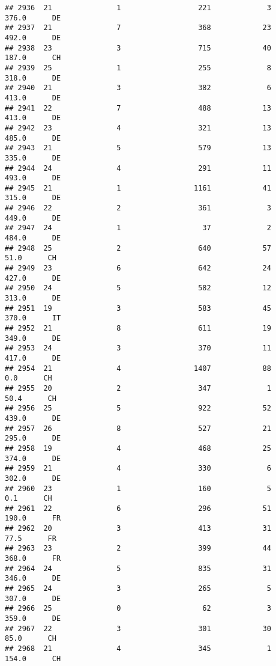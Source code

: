 \documentclass[
]{article}
\begin{document}
\begin{verbatim}
## 2936  21               1                  221             3    376.0      DE
## 2937  21               7                  368            23    492.0      DE
## 2938  23               3                  715            40    187.0      CH
## 2939  25               1                  255             8    318.0      DE
## 2940  21               3                  382             6    413.0      DE
## 2941  22               7                  488            13    413.0      DE
## 2942  23               4                  321            13    485.0      DE
## 2943  21               5                  579            13    335.0      DE
## 2944  24               4                  291            11    493.0      DE
## 2945  21               1                 1161            41    315.0      DE
## 2946  22               2                  361             3    449.0      DE
## 2947  24               1                   37             2    484.0      DE
## 2948  25               2                  640            57     51.0      CH
## 2949  23               6                  642            24    427.0      DE
## 2950  24               5                  582            12    313.0      DE
## 2951  19               3                  583            45    370.0      IT
## 2952  21               8                  611            19    349.0      DE
## 2953  24               3                  370            11    417.0      DE
## 2954  21               4                 1407            88      0.0      CH
## 2955  20               2                  347             1     50.4      CH
## 2956  25               5                  922            52    439.0      DE
## 2957  26               8                  527            21    295.0      DE
## 2958  19               4                  468            25    374.0      DE
## 2959  21               4                  330             6    302.0      DE
## 2960  23               1                  160             5      0.1      CH
## 2961  22               6                  296            51    190.0      FR
## 2962  20               3                  413            31     77.5      FR
## 2963  23               2                  399            44    368.0      FR
## 2964  24               5                  835            31    346.0      DE
## 2965  24               3                  265             5    307.0      DE
## 2966  25               0                   62             3    359.0      DE
## 2967  22               3                  301            30     85.0      CH
## 2968  21               4                  345             1    154.0      CH

\end{verbatim}
\end{document}
